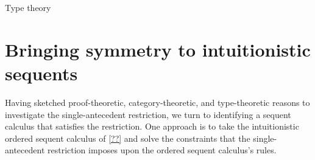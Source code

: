 \begin{description}
\item[Type theory]


\end{description}

\section{Bringing symmetry to intuitionistic sequents}\label{sec:singleton-logic:derive}





Having sketched proof-theoretic, category-theoretic, and type-theoretic reasons to investigate the single-antecedent restriction, we turn to identifying a sequent calculus that satisfies the restriction.
One approach is to take the intuitionistic ordered sequent calculus of \cref{??} and solve the constraints that the single-antecedent restriction imposes upon the ordered sequent calculus's rules.

